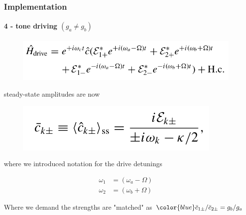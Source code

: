 \documentclass[aspectratio=43]{beamer}
\begin{document}
\begin{frame}
	
	\frametitle{Implementation}
	\framesubtitle{4 - tone driving $(g_{a} \neq g_{b})$}
	
	\begin{figure}
		\includegraphics[width = 8 cm]{plots/hamiltonian_4_tone.png}
	\end{figure}

	steady-state amplitudes are now

	\begin{figure}
		\includegraphics[width = 5 cm]{plots/ss_4_tone.png}
	\end{figure}

	where we introduced notation for the drive detunings

	\begin{align}
	\omega_{1} &= (\omega_{a} - \Omega) \nonumber \\
		\omega_{2} &= (\omega_{b} + \Omega) \nonumber
	\end{align}

	Where we demand the strengths are "matched" as ${\color{blue}\bar{c}_{1\pm} / \bar{c}_{2\pm} = g_{b} / g_{a}}$

\end{frame}
\end{document}
